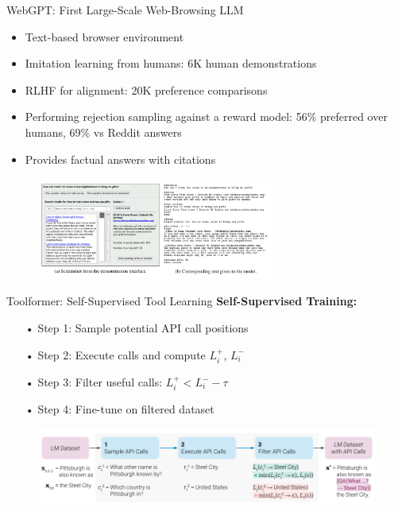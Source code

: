 \documentclass[aspectratio=169]{beamer}
\begin{document}
\begin{frame}{WebGPT: First Large-Scale Web-Browsing LLM}
		
		\begin{itemize}
			\item Text-based browser environment
			\item Imitation learning from humans: 6K human demonstrations
			\item RLHF for alignment: 20K preference comparisons
			\item Performing rejection sampling against a reward model:
			{\color{highlight}56\%} preferred over humans, {\color{highlight}69\%} vs Reddit answers
		\item Provides factual answers with citations
		\end{itemize}
	\begin{figure}
		\includegraphics[width=0.7\textwidth]{fig/WebGPT.jpg}
	\end{figure}
\end{frame}


\begin{frame}{Toolformer: Self-Supervised Tool Learning}
	\textbf{Self-Supervised Training:}
		\begin{itemize}
			\item[•] {\color{highlight}Step 1:} Sample potential API call positions
			\item[•] {\color{highlight}Step 2:} Execute calls and compute $L_i^+$, $L_i^-$
			\item[•] {\color{highlight}Step 3:} Filter useful calls: $L_i^+ < L_i^- - \tau$
			\item[•] {\color{highlight}Step 4:} Fine-tune on filtered dataset
		\end{itemize}
	\begin{figure}
		\includegraphics[width=\textwidth]{fig/Toolformer.jpg}
	\end{figure}
\end{frame}
\end{document}
